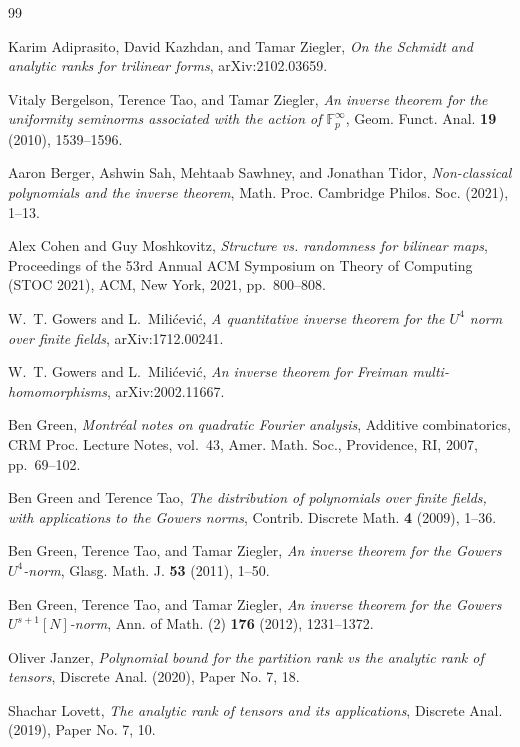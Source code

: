 \begin{thebibliography}{99}

Karim Adiprasito, David Kazhdan, and Tamar Ziegler, \emph{On the {S}chmidt and
  analytic ranks for trilinear forms}, arXiv:2102.03659.

Vitaly Bergelson, Terence Tao, and Tamar Ziegler, \emph{An inverse theorem for
  the uniformity seminorms associated with the action of {$\mathbb
  F^\infty_p$}}, Geom. Funct. Anal. \textbf{19} (2010), 1539--1596.

Aaron Berger, Ashwin Sah, Mehtaab Sawhney, and Jonathan Tidor,
  \emph{Non-classical polynomials and the inverse theorem}, Math. Proc. Cambridge Philos. Soc. (2021), 1--13.

Alex Cohen and Guy Moshkovitz, \emph{Structure vs. randomness for bilinear
  maps}, Proceedings of the 53rd {A}nnual {ACM} {S}ymposium on {T}heory of
  {C}omputing ({STOC} 2021), ACM, New York, 2021, pp.~800--808.

W.~T. Gowers and L.~Mili{\'c}evi{\'c}, \emph{A quantitative inverse theorem for
  the {$U^4$} norm over finite fields}, arXiv:1712.00241.
  
W.~T. Gowers and L.~Mili{\'c}evi{\'c}, \emph{An inverse theorem for {F}reiman
  multi-homomorphisms}, arXiv:2002.11667.

Ben Green, \emph{Montr\'{e}al notes on quadratic {F}ourier analysis}, Additive
  combinatorics, CRM Proc. Lecture Notes, vol.~43, Amer. Math. Soc.,
  Providence, RI, 2007, pp.~69--102.

Ben Green and Terence Tao, \emph{The distribution of polynomials over finite
  fields, with applications to the {G}owers norms}, Contrib. Discrete Math.
  \textbf{4} (2009), 1--36.

Ben Green, Terence Tao, and Tamar Ziegler, \emph{An inverse theorem for the
  {G}owers {$U^4$}-norm}, Glasg. Math. J. \textbf{53} (2011), 1--50.

Ben Green, Terence Tao, and Tamar Ziegler, \emph{An inverse theorem for the
  {G}owers {$U^{s+1}[N]$}-norm}, Ann. of Math. (2) \textbf{176} (2012),
  1231--1372.

Oliver Janzer, \emph{Polynomial bound for the partition rank vs the analytic
  rank of tensors}, Discrete Anal. (2020), Paper No. 7, 18.

Shachar Lovett, \emph{The analytic rank of tensors and its applications},
  Discrete Anal. (2019), Paper No. 7, 10.


\end{thebibliography}
